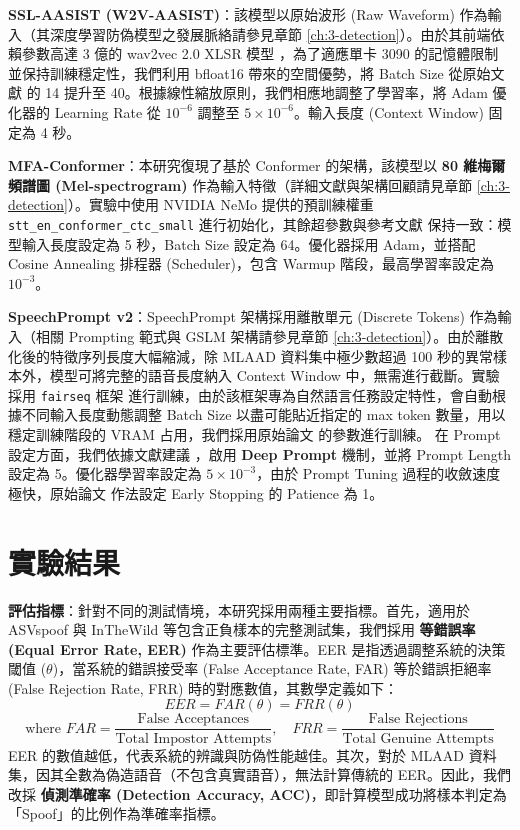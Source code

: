 \textbf{SSL-AASIST (W2V-AASIST)}：該模型以原始波形 (Raw Waveform) 作為輸入（其深度學習防偽模型之發展脈絡請參見章節 \ref{ch:3-detection}）。由於其前端依賴參數高達 3 億的 wav2vec 2.0 XLSR 模型 \cite{conneau2020unsupervised}，為了適應單卡 3090 的記憶體限制並保持訓練穩定性，我們利用 bfloat16 帶來的空間優勢，將 Batch Size 從原始文獻 \cite{tak2022automatic} 的 14 提升至 40。根據線性縮放原則，我們相應地調整了學習率，將 Adam 優化器的 Learning Rate 從 $10^{-6}$ 調整至 $5\times 10^{-6}$。輸入長度 (Context Window) 固定為 4 秒。

\textbf{MFA-Conformer}：本研究復現了基於 Conformer 的架構，該模型以 \textbf{80 維梅爾頻譜圖 (Mel-spectrogram)} 作為輸入特徵（詳細文獻與架構回顧請見章節 \ref{ch:3-detection}）。實驗中使用 NVIDIA NeMo \cite{kuchaiev2019nemo} 提供的預訓練權重 \texttt{stt\_en\_conformer\_ctc\_small} 進行初始化，其餘超參數與參考文獻 \cite{wang2023pretraining} 保持一致：模型輸入長度設定為 5 秒，Batch Size 設定為 64。優化器採用 Adam，並搭配 Cosine Annealing 排程器 (Scheduler)，包含 Warmup 階段，最高學習率設定為 $10^{-3}$。

\textbf{SpeechPrompt v2}：SpeechPrompt 架構採用離散單元 (Discrete Tokens) 作為輸入（相關 Prompting 範式與 GSLM 架構請參見章節 \ref{ch:3-detection}）。由於離散化後的特徵序列長度大幅縮減，除 MLAAD 資料集中極少數超過 100 秒的異常樣本外，模型可將完整的語音長度納入 Context Window 中，無需進行截斷。實驗採用 \texttt{fairseq} 框架 \cite{ott2019fairseq} 進行訓練，由於該框架專為自然語言任務設定特性，會自動根據不同輸入長度動態調整 Batch Size 以盡可能貼近指定的 max token 數量，用以穩定訓練階段的 VRAM 占用，我們採用原始論文 \cite{chang2023speechprompt} 的參數進行訓練。
在 Prompt 設定方面，我們依據文獻建議 \cite{chang2023speechprompt}，啟用 \textbf{Deep Prompt} 機制，並將 Prompt Length 設定為 5。優化器學習率設定為 $5\times 10^{-3}$，由於 Prompt Tuning 過程的收斂速度極快，原始論文 \cite{chang2023speechprompt} 作法設定 Early Stopping 的 Patience 為 1。



\section{實驗結果}
\label{sec:model_performance}

\textbf{評估指標}：針對不同的測試情境，本研究採用兩種主要指標。首先，適用於 ASVspoof 與 InTheWild 等包含正負樣本的完整測試集，我們採用 \textbf{等錯誤率 (Equal Error Rate, EER)} 作為主要評估標準。EER 是指透過調整系統的決策閾值 ($\theta$)，當系統的錯誤接受率 (False Acceptance Rate, FAR) 等於錯誤拒絕率 (False Rejection Rate, FRR) 時的對應數值，其數學定義如下：
\begin{equation}
    EER = FAR(\theta) = FRR(\theta)
\end{equation}
\begin{equation}
    \text{where } FAR = \frac{\text{False Acceptances}}{\text{Total Impostor Attempts}}, \quad FRR = \frac{\text{False Rejections}}{\text{Total Genuine Attempts}}
\end{equation}
EER 的數值越低，代表系統的辨識與防偽性能越佳。其次，對於 MLAAD 資料集，因其全數為偽造語音（不包含真實語音），無法計算傳統的 EER。因此，我們改採 \textbf{偵測準確率 (Detection Accuracy, ACC)}，即計算模型成功將樣本判定為「Spoof」的比例作為準確率指標。

